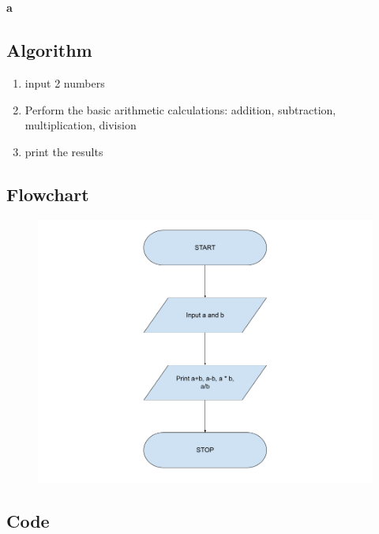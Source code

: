 \documentclass[12pt]{article}
\begin{document}
\section{}
\textbf{a}
\subsection{Algorithm}
\begin{enumerate}
    \item input 2 numbers
    \item Perform the basic arithmetic calculations: addition, subtraction, multiplication, division
    \item print the results
\end{enumerate}
\subsection{Flowchart}
\begin{figure}[h]
    \centering
    \includegraphics[width=1.0\textwidth]{Flowchart04a.png}
\end{figure}
\newpage
\subsection{Code}
\inputminted{c}{q4a.c}
\end{document}
